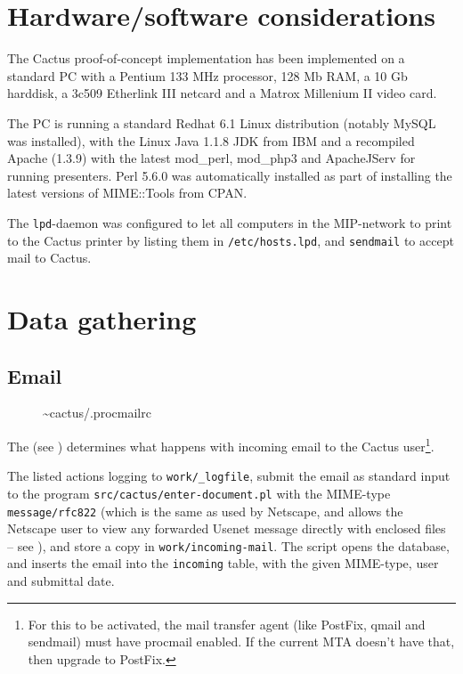 \section{Hardware/software considerations}

The Cactus proof-of-concept implementation has been implemented on a
standard PC with a Pentium 133 MHz processor, 128 Mb RAM, a 10 Gb
harddisk, a 3c509 Etherlink III netcard and a Matrox Millenium II
video card.

The PC is running a standard Redhat 6.1 Linux distribution (notably
MySQL was installed), with the Linux Java 1.1.8 JDK from IBM and a
recompiled Apache (1.3.9) with the latest mod\_perl, mod\_php3 and
ApacheJServ for running presenters.  Perl 5.6.0 was automatically
installed as part of installing the latest versions of MIME::Tools
from CPAN.

The \texttt{lpd}-daemon was configured to let all computers in the
MIP-network to print to the Cactus printer by listing them in
\texttt{/etc/hosts.lpd}, and \texttt{sendmail} to accept mail to
Cactus.



\section{Data gathering}


\subsection{Email}

\begin{figure}[htbp]
  \begin{center}
    \caption{\~{}cactus/.procmailrc}
    \label{fig:cactus-procmailrc}
  \end{center}
\end{figure}

The  (see
) determines what happens with incoming
email to the Cactus user\footnote{For this to be activated, the mail
  transfer agent (like PostFix, qmail and sendmail) must have procmail
  enabled.  If the current MTA doesn't have that, then upgrade to
  PostFix.}.


The listed actions logging to \texttt{work/_logfile}, submit the email
as standard input to the program \texttt{src/cactus/enter-document.pl}
with the MIME-type \texttt{message/rfc822} (which is the same as used
by Netscape, and allows the Netscape user to view any forwarded Usenet
message directly with enclosed files -- see
), and store a copy in
\texttt{work/incoming-mail}.  The script opens the database, and
inserts the email into the \texttt{incoming} table, with the given
MIME-type, user and submittal date.

